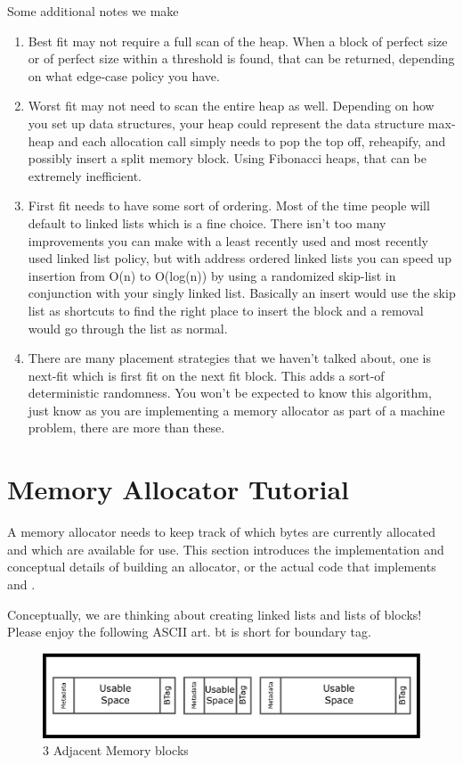 Some additional notes we make

\begin{enumerate}
\item Best fit may not require a full scan of the heap. When a block of perfect size or of perfect size within a threshold is found, that can be returned, depending on what edge-case policy you have.
\item Worst fit may not need to scan the entire heap as well. Depending on how you set up data structures, your heap could represent the data structure max-heap and each allocation call simply needs to pop the top off, reheapify, and possibly insert a split memory block.
  Using Fibonacci heaps, that can be extremely inefficient.
\item First fit needs to have some sort of ordering. Most of the time people will default to linked lists which is a fine choice. There isn't too many improvements you can make with a least recently used and most recently used linked list policy, but with address ordered linked lists you can speed up insertion from O(n) to O(log(n)) by using a randomized skip-list in conjunction with your singly linked list.
  Basically an insert would use the skip list as shortcuts to find the right place to insert the block and a removal would go through the list as normal.
\item There are many placement strategies that we haven't talked about, one is next-fit which is first fit on the next fit block. This adds a sort-of deterministic randomness. You won't be expected to know this algorithm, just know as you are implementing a memory allocator as part of a machine problem, there are more than these.
  \end{enumerate}

\section{Memory Allocator Tutorial}

A memory allocator needs to keep track of which bytes are currently allocated and which are available for use.
This section introduces the implementation and conceptual details of building an allocator, or the actual code that implements  and .

Conceptually, we are thinking about creating linked lists and lists of blocks!
Please enjoy the following ASCII art.
bt is short for boundary tag.


\begin{figure}[H]
\centering
\includegraphics[width=.7\textwidth]{malloc/drawings/malloc_patching.png}
\caption{3 Adjacent Memory blocks}
\end{figure}

